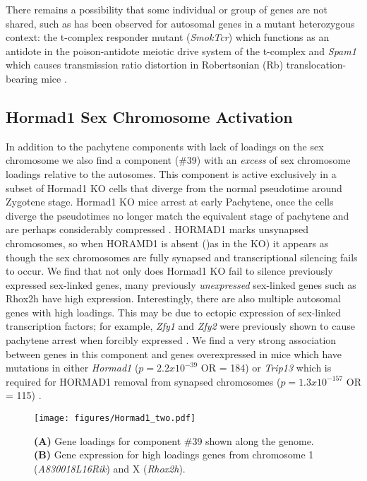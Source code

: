 There remains a possibility that some individual or group of genes are not shared, such as has been observed for autosomal genes in a mutant heterozygous context: the t-complex responder mutant (\textit{SmokTcr}) which functions as an antidote in the poison-antidote meiotic drive system of the t-complex \cite{Veron2009Retention} and \textit{Spam1} which causes transmission ratio distortion in Robertsonian (Rb) translocation-bearing mice \cite{Martin-DeLeon2005Spam1associated}.

\subsection{Hormad1 Sex Chromosome Activation}
In addition to the pachytene components with lack of loadings on the sex chromosome we also find a component (\#39) with an \textit{excess} of sex chromosome loadings relative to the autosomes. This component is active exclusively in a subset of Hormad1 KO cells that diverge from the normal pseudotime around Zygotene stage. Hormad1 KO mice arrest at early Pachytene, once the cells diverge the pseudotimes no longer match the equivalent stage of pachytene and are perhaps considerably compressed \parencite{Shin2010Hormad1}. HORMAD1 marks unsynapsed chromosomes, so when HORAMD1 is absent ()as in the KO) it appears as though the sex chromosomes are fully synapsed and transcriptional silencing fails to occur. We find that not only does Hormad1 KO fail to silence previously expressed sex-linked genes, many previously \textit{unexpressed} sex-linked genes such as Rhox2h have high expression. Interestingly, there are also multiple autosomal genes with high loadings. This may be due to ectopic expression of sex-linked transcription factors; for example, \textit{Zfy1} and \textit{Zfy2} were previously shown to cause pachytene arrest when forcibly expressed \cite{Royo2010Evidence}. We find a very strong association between genes in this component and genes overexpressed in mice which have mutations in either \textit{Hormad1} ($p = 2.2x10^{-39}$ OR = 184) or \textit{Trip13} which is required for HORMAD1 removal from synapsed chromosomes ($p = 1.3x10^{-157}$ OR = 115) \cite{Ortega2016Surveillance, Wojtasz2009Mouse}.

\begin{figure}[H]
	\centering
	\texttt{[image: figures/Hormad1\_two.pdf]}
	\caption{
		\textbf{(A)} Gene loadings for component \#39 shown along the genome.
		\textbf{(B)} Gene expression for high loadings genes from chromosome 1 (\textit{A830018L16Rik}) and X (\textit{Rhox2h}).
	}
	\label{fig:Hormad1}
\end{figure}


